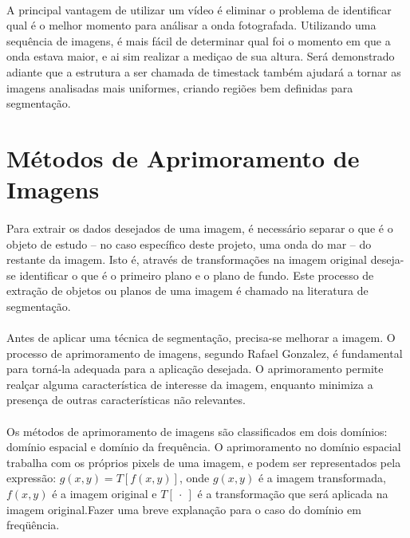 \paragraph{}A principal vantagem de utilizar um vídeo é eliminar o problema de identificar qual é o melhor momento para análisar a onda fotografada. Utilizando uma sequência de imagens, é mais fácil de determinar qual foi o momento em que a onda estava maior, e ai sim realizar a mediçao de sua altura. Será demonstrado adiante que a estrutura a ser chamada de timestack também ajudará a tornar as imagens analisadas mais uniformes, criando regiões bem definidas para segmentação. 









\section{Métodos de Aprimoramento de Imagens } %

\paragraph{}Para extrair os dados desejados de uma imagem, é necessário separar o que é o objeto de estudo -- no caso específico deste projeto, uma onda do mar -- do restante da imagem. Isto é, através de transformações na imagem original deseja-se identificar o que é o primeiro plano e o plano de fundo. Este processo de extração de objetos ou planos de uma imagem é chamado na literatura de segmentação\cite{Gonzalez92}.

\paragraph{}Antes de aplicar uma técnica de segmentação, precisa-se melhorar a imagem. O processo de aprimoramento de imagens, segundo Rafael Gonzalez\cite{Gonzalez92}, é fundamental para torná-la adequada para a aplicação desejada. O aprimoramento permite realçar alguma característica de interesse da imagem, enquanto minimiza a presença de outras características não relevantes.


\paragraph{}Os métodos de aprimoramento de imagens são classificados em dois domínios: domínio espacial e domínio da frequência. 
O aprimoramento no domínio espacial trabalha com os próprios pixels de uma imagem, e podem ser representados pela expressão: \(g(x,y) = T[f(x,y)]\), onde \( g(x,y) \) é a imagem transformada, \( f(x,y) \) é a imagem original e \( T[ \ \cdot\  ] \) é a transformação que será aplicada na imagem original.Fazer uma breve explanação para o caso do domínio em freqüência.

